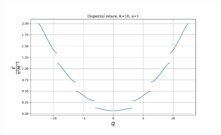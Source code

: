\documentclass[10pt,a4paper]{article}
\begin{document}
\begin{figure}[p]
    \centering
    \includegraphics[scale=0.7]{disperzni10.pdf}
    \label{}
\end{figure}

\pagebreak
\end{document}
